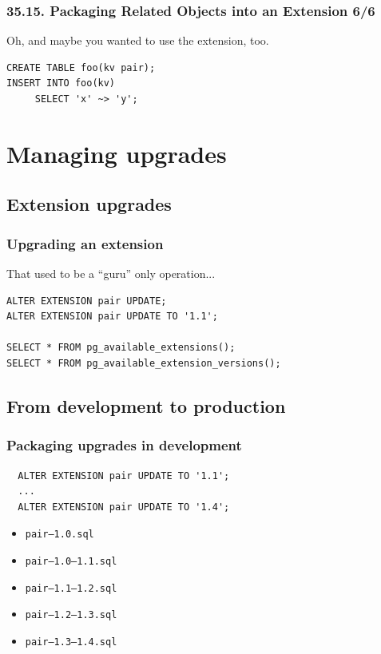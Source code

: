 \documentclass[english]{beamer}
\begin{document}
\begin{frame}[fragile]
  \frametitle{35.15. Packaging Related Objects into an Extension 6/6}

  Oh, and maybe you wanted to use the extension, too.

\begin{example}[psql]
\begin{verbatim}
CREATE TABLE foo(kv pair);
INSERT INTO foo(kv)
     SELECT 'x' ~> 'y';
\end{verbatim}
\end{example}
\end{frame}

\section{Managing upgrades}

\subsection{Extension upgrades}

\begin{frame}[fragile]
  \frametitle{Upgrading an extension}

  That used to be a ``guru'' only operation...

\begin{example}
\begin{verbatim}
ALTER EXTENSION pair UPDATE;
ALTER EXTENSION pair UPDATE TO '1.1';

SELECT * FROM pg_available_extensions();
SELECT * FROM pg_available_extension_versions();
\end{verbatim}
\end{example}
\end{frame}

\subsection{From development to production}

\begin{frame}[fragile]
  \frametitle{Packaging upgrades in development}

\begin{example}[update to 1.4]
\begin{verbatim}
  ALTER EXTENSION pair UPDATE TO '1.1';
  ...
  ALTER EXTENSION pair UPDATE TO '1.4';
\end{verbatim}
\end{example}

  \begin{itemize}
   \item<1-> \texttt{pair---1.0.sql}
   \item<2-> \texttt{pair---1.0---1.1.sql}
   \item<3-> \texttt{pair---1.1---1.2.sql}
   \item<3-> \texttt{pair---1.2---1.3.sql}
   \item<3-> \texttt{pair---1.3---1.4.sql}
  \end{itemize}
\end{frame}
\end{document}
